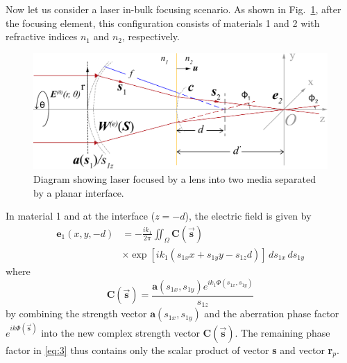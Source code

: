 \documentclass[9pt,twocolumn,twoside]{osajnl}
\begin{document}
Now let us consider a laser in-bulk focusing scenario. As shown in Fig.~\ref{fig:1}, after the focusing element, this configuration consists of materials 1 and 2 with refractive indices $n_1$ and $n_2$, respectively.

\begin{figure}
	\centering
	\includegraphics[width=\linewidth]{vectorDiffractionTheory.pdf}
	\caption{Diagram showing laser focused by a lens into two media separated by a planar interface.}\label{fig:1}
\end{figure}

In material 1 and at the interface ($z=-d$), the electric field is given by
\begin{equation}\label{eq:3}
	\begin{aligned}
		\textbf{e}_1(x,y,-d)&=-\frac{ik_1}{2\pi}\iint_\Omega\textbf{C}(\vec{\mathbf{s}})\\
	&\times\exp[ik_1(s_{1x}x+s_{1y}y-s_{1z}d)]\,ds_{1x}\,ds_{1y}	
	\end{aligned}
\end{equation}
where 
\begin{equation}
	\textbf{C}(\vec{\mathbf{s}})=\frac{\textbf{a}(s_{1x},s_{1y})e^{ik_1\Phi(s_{1x},s_{1y})}}{s_{1z}}
\end{equation}\label{eq:4}
by combining the strength vector $\mathbf{a}(s_{1x},s_{1y})$ and the aberration phase factor $e^{ik\Phi(\vec{\mathbf{s}})}$ into the new complex strength vector $\textbf{C}(\vec{\mathbf{s}})$. The remaining phase factor in \eqref{eq:3} thus contains only the scalar product of vector \textbf{s} and vector \textbf{r}$_p$.
\end{document}
